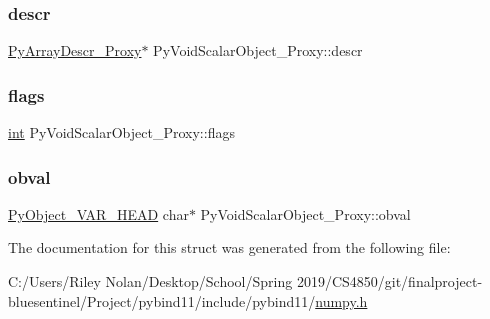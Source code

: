\mbox{\label{struct_py_void_scalar_object___proxy_a6e3851062e08d8c71a2c6f5439a595f4}} 
\subsubsection{\texorpdfstring{descr}{descr}}
{\footnotesize\ttfamily \mbox{\hyperlink{struct_py_array_descr___proxy}{Py\+Array\+Descr\+\_\+\+Proxy}}$\ast$ Py\+Void\+Scalar\+Object\+\_\+\+Proxy\+::descr}

\mbox{\label{struct_py_void_scalar_object___proxy_ab6e25ceec2dd6abd59c6f179951266d6}} 
\subsubsection{\texorpdfstring{flags}{flags}}
{\footnotesize\ttfamily \mbox{\hyperlink{warnings_8h_a74f207b5aa4ba51c3a2ad59b219a423b}{int}} Py\+Void\+Scalar\+Object\+\_\+\+Proxy\+::flags}

\mbox{\label{struct_py_void_scalar_object___proxy_a546b291985bc240b6cbe49bec86f8f63}} 
\subsubsection{\texorpdfstring{obval}{obval}}
{\footnotesize\ttfamily \mbox{\hyperlink{_python27_2object_8h_aa0eba161a76be8710b3de325c2e7f9e2}{Py\+Object\+\_\+\+V\+A\+R\+\_\+\+H\+E\+AD}} char$\ast$ Py\+Void\+Scalar\+Object\+\_\+\+Proxy\+::obval}



The documentation for this struct was generated from the following file\+:\begin{DoxyCompactItemize}
\item 
C\+:/\+Users/\+Riley Nolan/\+Desktop/\+School/\+Spring 2019/\+C\+S4850/git/finalproject-\/bluesentinel/\+Project/pybind11/include/pybind11/\mbox{\hyperlink{numpy_8h}{numpy.\+h}}\end{DoxyCompactItemize}
